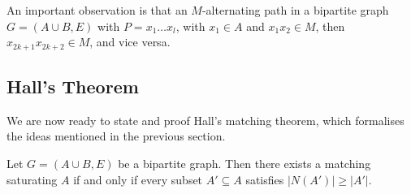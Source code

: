 \documentclass[a4paper]{scrartcl}
\begin{document}
An important observation is that an $M$-alternating path in a bipartite graph $G = (A\cup B, E)$ with $P = x_1 \dots x_l$, with $x_1 \in A$ and $x_1 x_2 \in M$, then $x_{2k + 1}x_{2k + 2} \in M$, and vice versa.

\subsection{Hall's Theorem}

We are now ready to state and proof Hall's matching theorem, which formalises the ideas mentioned in the previous section.

\begin{theorem}
	Let $G = (A \cup B, E)$ be a bipartite graph. Then there exists a matching saturating $A$ if and only if every subset $A' \subseteq A$ satisfies $|N(A')| \geq |A'|$.
\end{theorem}
\end{document}
